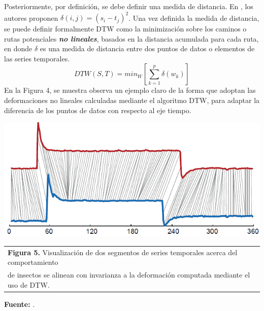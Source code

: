 Posteriormente, por definici\'on, se debe definir una medida de distancia. En \cite{dtw}, los autores proponen $\delta(i,j) = (s_i - t_j)^2$. Una vez definida la medida de distancia, se puede definir formalmente DTW como la minimizaci\'on sobre los caminos o rutas potenciales \textbf{\textit{no lineales}}, basados en la distancia acumulada para cada ruta, en donde $\delta$ es una medida de distancia entre dos puntos de datos o elementos de las series temporales.
\begin{equation}
DTW (S,T) = min_W[\sum\limits_{k=1}^{p}\delta(w_k)]
\end{equation}
En la Figura 4, se muestra observa un ejemplo claro de la forma que adoptan las deformaciones no lineales calculadas mediante el algoritmo DTW, para adaptar la diferencia de los puntos de datos con respecto al eje tiempo.
\begin{center}
\includegraphics[scale=0.7]{dtw2.png}\\
\vspace*{10pt}
\footnotesize{
\begin{tabular}{l}
\textbf{Figura 5.} Visualizaci\'on de dos segmentos de series temporales
acerca del comportamiento\\ de insectos se alinean con invarianza a la deformaci\'on computada mediante el uso de DTW.
\end{tabular}{}
}
\textbf{Fuente:} \cite{dtw}.
\end{center}
